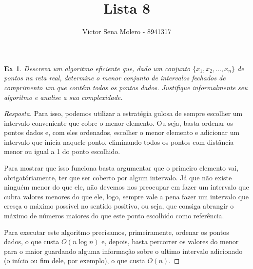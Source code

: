 \documentclass[12pt]{article}
\newcounter{exCounter}
\newtheorem{ex}[exCounter]{Ex}
\begin{document}
 
 
\title{Lista 8}
\author{Victor Sena Molero - 8941317}
\maketitle

\begin{ex}
Descreva um algoritmo eficiente que, dado um conjunto $\{x_1, x_2, \dots, x_n\}$ de pontos na reta real, determine o menor conjunto de intervalos fechados de comprimento um que contém todos os pontos dados. Justifique informalmente seu algoritmo e analise a sua complexidade.
\end{ex}

\begin{proof}[Resposta]
Para isso, podemos utilizar a estratégia gulosa de sempre escolher um intervalo conveniente que cobre o menor elemento. Ou seja, basta ordenar os pontos dados e, com eles ordenados, escolher o menor elemento e adicionar um intervalo que inicia naquele ponto, eliminando todos os pontos com distância menor ou igual a 1 do ponto escolhido.

Para mostrar que isso funciona basta argumentar que o primeiro elemento vai, obrigatóriamente, ter que ser coberto por algum intervalo. Já que não existe ninguém menor do que ele, não devemos nos preocupar em fazer um intervalo que cubra valores menores do que ele, logo, sempre vale a pena fazer um intervalo que cresça o máximo possível no sentido positivo, ou seja, que consiga abrangir o máximo de números maiores do que este ponto escolhido como referência.

Para executar este algoritmo precisamos, primeiramente, ordenar os pontos dados, o que custa $O(n \log{n})$ e, depois, basta percorrer os valores do menor para o maior guardando alguma informação sobre o ultimo intervalo adicionado (o início ou fim dele, por exemplo), o que custa $O(n)$.
\end{proof}
\end{document}
